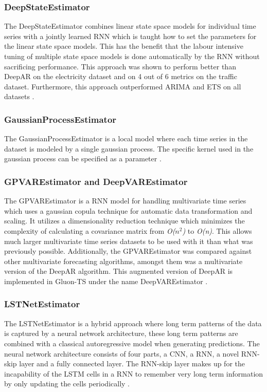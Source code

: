 \subsubsection{DeepStateEstimator}
The DeepStateEstimator combines linear state space models for individual time series with a jointly learned RNN which is taught how to set the parameters for the linear state space models. This has the benefit that the labour intensive tuning of multiple state space models is done automatically by the RNN without sacrificing performance. This approach was shown to perform better than DeepAR on the electricity dataset and on 4 out of 6 metrics on the traffic dataset. Furthermore, this approach outperformed ARIMA and ETS on all datasets \cite{rangapuram_deep_2018}.

\subsubsection{GaussianProcessEstimator}
The GaussianProcessEstimator is a local model where each time series in the dataset is modeled by a single gaussian process.
The specific kernel used in the gaussian process can be specified as a parameter \cite{gluonts-website}.

\subsubsection{GPVAREstimator and DeepVAREstimator}
\label{algo:gpvar}
The GPVAREstimator is a RNN model for handling multivariate time series which uses a gaussian copula technique for automatic data transformation and scaling. It utilizes a dimensionality reduction technique which minimizes the complexity of calculating a covariance matrix from \textit{O($n^2$)} to \textit{O(n)}. This allows much larger multivariate time series datasets to be used with it than what was previously possible. Additionally, the GPVAREstimator was compared against other multivariate forecasting algorithms, amongst them was a multivariate version of the DeepAR algorithm. This augmented version of DeepAR is implemented in Gluon-TS under the name DeepVAREstimator \cite{salinas_high-dimensional_2019}.

\subsubsection{LSTNetEstimator}
The LSTNetEstimator is a hybrid approach where long term patterns of the data is captured by a neural network architecture, these long term patterns are combined with a classical autoregressive model when generating predictions. The neural network architecture consists of four parts, a CNN, a RNN, a novel RNN-skip layer and a fully connected layer. The RNN-skip layer makes up for the incapability of the LSTM cells in a RNN to remember very long term information by only updating the cells periodically \cite{lai_modeling_2018}.

